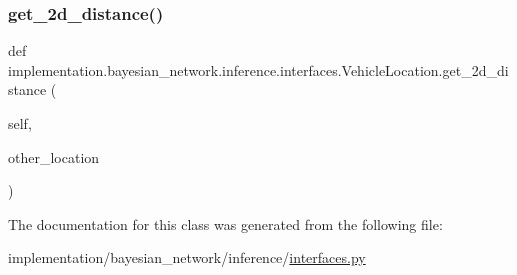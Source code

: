 \subsubsection{\texorpdfstring{get\+\_\+2d\+\_\+distance()}{get\_2d\_distance()}}
{\footnotesize\ttfamily def implementation.\+bayesian\+\_\+network.\+inference.\+interfaces.\+Vehicle\+Location.\+get\+\_\+2d\+\_\+distance (\begin{DoxyParamCaption}\item[{}]{self,  }\item[{}]{other\+\_\+location }\end{DoxyParamCaption})}



The documentation for this class was generated from the following file\+:\begin{DoxyCompactItemize}
\item 
implementation/bayesian\+\_\+network/inference/\hyperlink{interfaces_8py}{interfaces.\+py}\end{DoxyCompactItemize}
